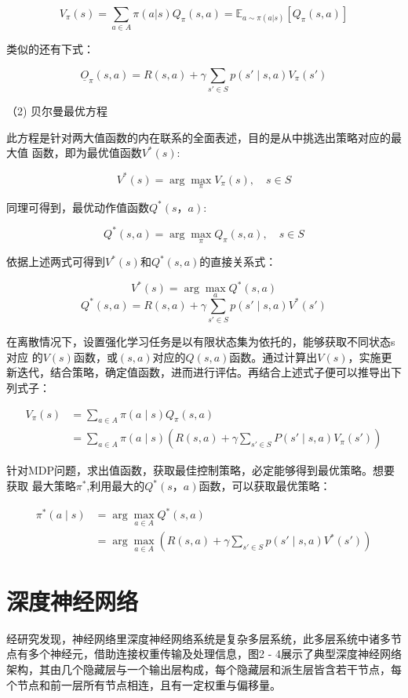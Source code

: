 \[
V_{\pi}(s) = \sum_{a \in A} \pi(a|s) Q_{\pi}(s,a) = \mathbb{E}_{a \sim \pi(a|s)} \left[ Q_{\pi}(s,a) \right]
\]

类似的还有下式：

\[
\underline{O}_{\pi}(s, a) = R(s, a) + \gamma \sum_{s' \in S} p(s' \mid s, a) V_{\pi}(s')
\]

（2) 贝尔曼最优方程

此方程是针对两大值函数的内在联系的全面表述，目的是从中挑选出策略对应的最大值
函数，即为最优值函数$V^*(s)$:

\[
V^*(s) = \arg\max_{\pi} V_{\pi}(s), \quad s \in S
\]

同理可得到，最优动作值函数$Q^*(s，a)$:

\[
Q^*(s, a) = \arg\max_{\pi} Q_{\pi}(s, a), \quad s \in S
\]

依据上述两式可得到$V^*(s)$和$Q^*(s,a)$的直接关系式：

\[
V^*(s) = \arg\max_{a} Q^*(s, a)
\]
\[
Q^*(s, a) = R(s, a) + \gamma \sum_{s' \in S} p(s' \mid s, a) V^*(s')
\]

在离散情况下，设置强化学习任务是以有限状态集为依托的，能够获取不同状态s对应
的$V(s)$函数，或$(s,a)$对应的$Q(s,a)$函数。通过计算出$V(s)$，实施更新迭代，结合策略，确定值函数，进而进行评估。再结合上述式子便可以推导出下列式子：

\begin{align*}
	V_{\pi}(s) &= \sum_{a \in A} \pi(a \mid s) Q_{\pi}(s, a) \\
	&= \sum_{a \in A} \pi(a \mid s) \left( R(s, a) + \gamma \sum_{s' \in S} P(s' \mid s, a) V_{\pi}(s') \right)
\end{align*}

针对MDP问题，求出值函数，获取最佳控制策略，必定能够得到最优策略。想要获取
最大策略$\pi^*$,利用最大的$Q^*(s，a)$函数，可以获取最优策略：

\begin{align*}
	\pi^*(a \mid s) &= \arg\max_{a \in A} Q^*(s, a) \\
	&= \arg\max_{a \in A} \left( R(s, a) + \gamma \sum_{s' \in S} p(s' \mid s, a) V^*(s') \right)
\end{align*}

\section{深度神经网络}

经研究发现，神经网络里深度神经网络系统是复杂多层系统，此多层系统中诸多节点有多个神经元，借助连接权重传输及处理信息，图2 - 4展示了典型深度神经网络架构，其由几个隐藏层与一个输出层构成，每个隐藏层和派生层皆含若干节点，每个节点和前一层所有节点相连，且有一定权重与偏移量。

